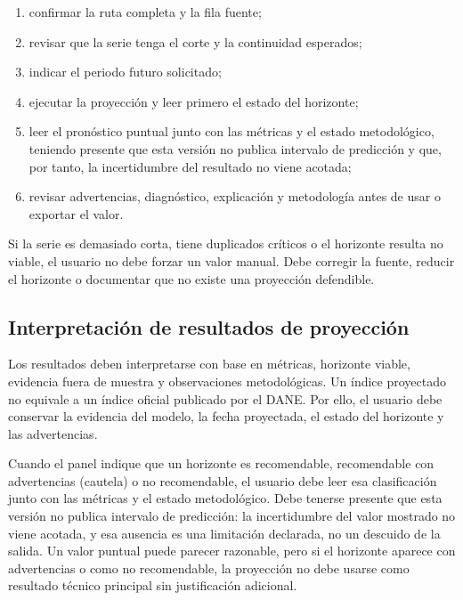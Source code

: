 \documentclass[12pt,letterpaper]{article}
\newcommand{\DANE}{DANE}
\begin{document}
\begin{enumerate}
\item confirmar la ruta completa y la fila fuente;
\item revisar que la serie tenga el corte y la continuidad esperados;
\item indicar el periodo futuro solicitado;
\item ejecutar la proyección y leer primero el estado del horizonte;
\item leer el pronóstico puntual junto con las métricas y el estado metodológico, teniendo presente que esta versión no publica intervalo de predicción y que, por tanto, la incertidumbre del resultado no viene acotada;
\item revisar advertencias, diagnóstico, explicación y metodología antes de usar o exportar el valor.
\end{enumerate}

Si la serie es demasiado corta, tiene duplicados críticos o el horizonte resulta no viable, el usuario no debe forzar un valor manual. Debe corregir la fuente, reducir el horizonte o documentar que no existe una proyección defendible.

\subsection{Interpretación de resultados de proyección}

Los resultados deben interpretarse con base en métricas, horizonte viable, evidencia fuera de muestra y observaciones metodológicas. Un índice proyectado no equivale a un índice oficial publicado por el \DANE. Por ello, el usuario debe conservar la evidencia del modelo, la fecha proyectada, el estado del horizonte y las advertencias.

Cuando el panel indique que un horizonte es recomendable, recomendable con advertencias (cautela) o no recomendable, el usuario debe leer esa clasificación junto con las métricas y el estado metodológico. Debe tenerse presente que esta versión no publica intervalo de predicción: la incertidumbre del valor mostrado no viene acotada, y esa ausencia es una limitación declarada, no un descuido de la salida. Un valor puntual puede parecer razonable, pero si el horizonte aparece con advertencias o como no recomendable, la proyección no debe usarse como resultado técnico principal sin justificación adicional.
\end{document}
